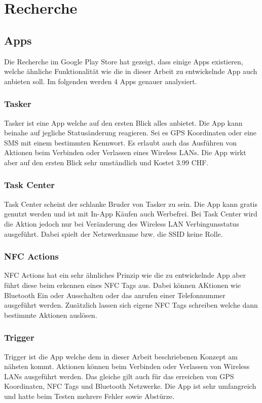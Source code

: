 \chapter{Recherche}
\label{sec:recherche}

\section{Apps}
Die Recherche im Google Play Store hat gezeigt, dass einige Apps existieren, welche ähnliche Funktionalität wie die in dieser Arbeit zu entwickelnde App auch anbieten soll. Im folgenden werden 4 Apps genauer analysiert.

\subsection{Tasker}
Tasker\citep{google.play.tasker} ist eine App welche auf den ersten Blick alles anbietet. Die App kann beinahe auf jegliche Statusänderung reagieren. Sei es GPS Koordinaten oder eine SMS mit einem bestimmten Kennwort. Es erlaubt auch das Ausführen von Aktionen beim Verbinden oder Verlassen eines Wireless LANs. Die App wirkt aber auf den ersten Blick sehr umständlich und Kostet 3.99 CHF.

\subsection{Task Center}
Task Center\citep{google.play.taskcenter} scheint der schlanke Bruder von Tasker zu sein. Die App kann gratis genutzt werden und ist mit In-App Käufen auch Werbefrei. Bei Task Center wird die Aktion jedoch nur bei Veränderung des Wireless LAN Verbingunsstatus ausgeführt. Dabei spielt der Netzwerkname bzw. die SSID keine Rolle.

\subsection{NFC Actions}
NFC Actions\citep{google.play.nfcactions} hat ein sehr ähnliches Prinzip wie die zu entwickelnde App aber führt diese beim erkennen eines NFC Tags aus. Dabei können AKtionen wie Bluetooth Ein oder Ausschalten oder das anrufen einer Telefonnummer ausgeführt werden. Zusätzlich lassen sich eigene NFC Tags schreiben welche dann bestimmte Aktionen auslösen.

\subsection{Trigger}
Trigger\citep{google.play.trigger} ist die App welche dem in dieser Arbeit beschriebenen Konzept am nähsten kommt. Aktionen können beim Verbinden oder Verlassen von Wireless LANs ausgeführt werden. Das gleiche gilt auch für das erreichen von GPS Koordinaten, NFC Tags und Bluetooth Netzwerke. Die App ist sehr umfangreich und hatte beim Testen mehrere Fehler sowie Abstürze.

